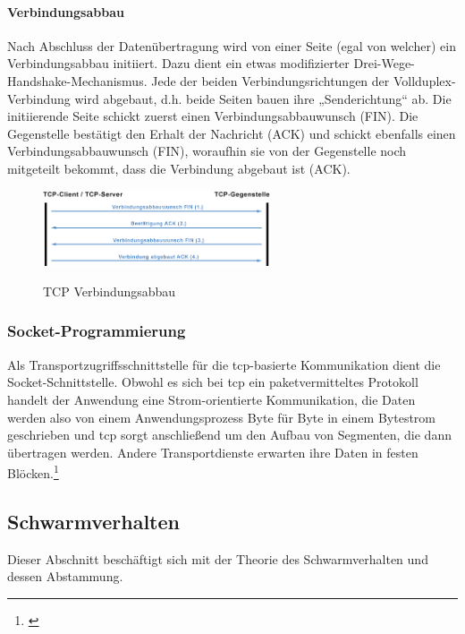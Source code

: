 \paragraph{Verbindungsabbau}
Nach Abschluss der Datenübertragung wird von einer Seite (egal von welcher) ein Verbindungsabbau initiiert. Dazu dient ein etwas modifizierter Drei-Wege-Handshake-Mechanismus. Jede der beiden Verbindungsrichtungen der Vollduplex-Verbindung wird abgebaut, d.h. beide Seiten bauen ihre „Senderichtung“ ab. Die initiierende Seite schickt zuerst einen Verbindungsabbauwunsch (FIN). Die Gegenstelle bestätigt den Erhalt der Nachricht (ACK) und schickt ebenfalls einen Verbindungsabbauwunsch (FIN), woraufhin sie von der Gegenstelle noch mitgeteilt bekommt, dass die Verbindung abgebaut ist (ACK).
\begin{figure}[h]
	\centering
	\includegraphics[width=0.6\textwidth]{images/Verbindungsabbau.png}
	\caption[TCP Verbindungsabbau]{TCP Verbindungsabbau}
	\cite{Schnabel.TCPKommunikation}
	\label{fig:<Sprungmakre>}
\end{figure}
\subsubsection{Socket-Programmierung}\label{tcpsocket}
Als Transportzugriffsschnittstelle für die \gls{tcp}-basierte Kommunikation dient die Socket-Schnittstelle.
Obwohl es sich bei \gls{tcp} ein paketvermitteltes Protokoll handelt der Anwendung eine Strom-orientierte Kommunikation, die Daten werden also von einem Anwendungsprozess Byte für Byte in einem Bytestrom geschrieben und \gls{tcp} sorgt anschließend um den Aufbau von Segmenten, die dann übertragen werden. Andere Transportdienste erwarten ihre Daten in festen Blöcken.\footnote{\citep[vgl.][Grundkurs Datenkommunikation, Seite 96 f. f.]{Mandl.GrundkursDatenkommunikation}\label{note67}}

\newpage
\subsection{Schwarmverhalten}

Dieser Abschnitt beschäftigt sich mit der Theorie des Schwarmverhalten und dessen Abstammung.

